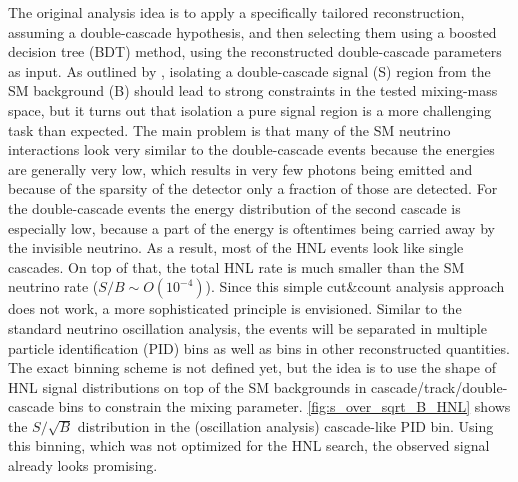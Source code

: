\documentclass[a4paper,11pt]{article}
\begin{document}
The original analysis idea is to apply a specifically tailored reconstruction, assuming a double-cascade hypothesis, and then selecting them using a boosted decision tree (BDT) method, using the reconstructed double-cascade parameters as input. As outlined by \cite{Coloma:2017ppo}, isolating a double-cascade signal (S) region from the SM background (B) should lead to strong constraints in the tested mixing-mass space, but it turns out that isolation a pure signal region is a more challenging task than expected. The main problem is that many of the SM neutrino interactions look very similar to the double-cascade events because the energies are generally very low, which results in very few photons being emitted and because of the sparsity of the detector only a fraction of those are detected. For the double-cascade events the energy distribution of the second cascade is especially low, because a part of the energy is oftentimes being carried away by the invisible neutrino. As a result, most of the HNL events look like single cascades. On top of that, the total HNL rate is much smaller than the SM neutrino rate ($S/B\sim O(10^{-4})$). Since this simple cut\&count analysis approach does not work, a more sophisticated principle is envisioned. Similar to the standard neutrino oscillation analysis, the events will be separated in multiple particle identification (PID) bins as well as bins in other reconstructed quantities. The exact binning scheme is not defined yet, but the idea is to use the shape of HNL signal distributions on top of the SM backgrounds in cascade/track/double-cascade bins to constrain the mixing parameter. \cref{fig:s_over_sqrt_B_HNL} shows the $S/\sqrt{B}$ distribution in the (oscillation analysis) cascade-like PID bin. Using this binning, which was not optimized for the HNL search, the observed signal already looks promising.

\footnotesize


\end{document}

